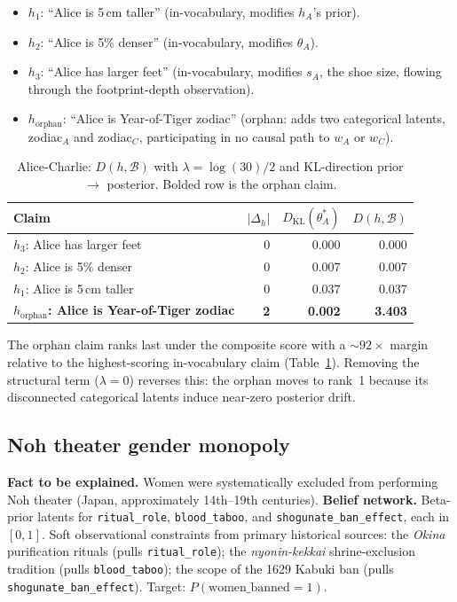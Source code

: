 \documentclass{article}
\begin{document}
\begin{itemize}[leftmargin=*, itemsep=0pt]
\item $h_{1}$: ``Alice is 5\,cm taller'' (in-vocabulary, modifies
$h_{A}$'s prior).
\item $h_{2}$: ``Alice is 5\% denser'' (in-vocabulary, modifies
$\theta_{A}$).
\item $h_{3}$: ``Alice has larger feet'' (in-vocabulary, modifies
$s_{A}$, the shoe size, flowing through the
footprint-depth observation).
\item $h_{\mathrm{orphan}}$: ``Alice is Year-of-Tiger zodiac''
(orphan: adds two categorical latents, zodiac$_{A}$ and
zodiac$_{C}$, participating in no causal path to $w_{A}$ or $w_{C}$).
\end{itemize}

\begin{table}[t]
\centering
\caption{Alice-Charlie: $D(h, \mathcal{B})$ with $\lambda = \log(30)/2$
and KL-direction prior $\to$ posterior. Bolded row is the orphan claim.}
\label{tab:alice-charlie}
\begin{tabular}{lrrr}
\toprule
Claim & $|\Delta_{h}|$ & $D_{\mathrm{KL}}(\theta^{*}_{A})$ & $D(h, \mathcal{B})$ \\
\midrule
$h_{3}$: Alice has larger feet & 0 & 0.000 & 0.000 \\
$h_{2}$: Alice is 5\% denser   & 0 & 0.007 & 0.007 \\
$h_{1}$: Alice is 5\,cm taller & 0 & 0.037 & 0.037 \\
\midrule
\textbf{$h_{\mathrm{orphan}}$: Alice is Year-of-Tiger zodiac} & \textbf{2} & \textbf{0.002} & \textbf{3.403} \\
\bottomrule
\end{tabular}
\end{table}

The orphan claim ranks last under the composite score with a
$\sim 92\times$ margin relative to the highest-scoring in-vocabulary
claim (Table~\ref{tab:alice-charlie}). Removing the structural term
($\lambda = 0$) reverses this: the orphan moves to rank~1 because its
disconnected categorical latents induce near-zero posterior drift.

\subsection{Noh theater gender monopoly}
\label{sec:noh}

\textbf{Fact to be explained.} Women were systematically excluded from
performing Noh theater (Japan, approximately 14th--19th centuries).
\textbf{Belief network.} Beta-prior latents for
\texttt{ritual\_role}, \texttt{blood\_taboo}, and
\texttt{shogunate\_ban\_effect}, each in $[0, 1]$. Soft observational
constraints from primary historical sources: the \emph{Okina}
purification rituals (pulls \texttt{ritual\_role}); the
\emph{nyonin-kekkai} shrine-exclusion tradition (pulls
\texttt{blood\_taboo}); the scope of the 1629 Kabuki ban (pulls
\texttt{shogunate\_ban\_effect}). Target:
$P(\text{women\_banned} = 1)$.
\end{document}
